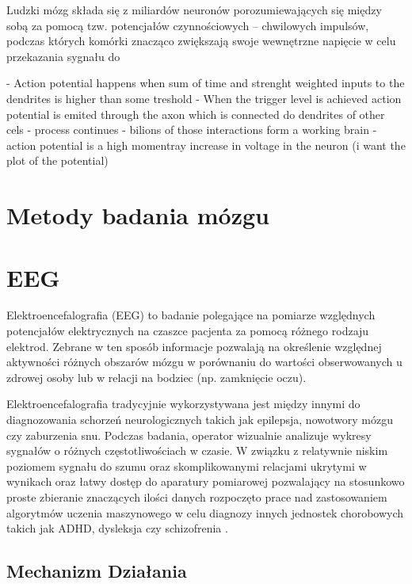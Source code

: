 \documentclass{./assets/wfis}
\begin{document}
Ludzki mózg składa się z miliardów neuronów porozumiewających się między sobą za pomocą tzw. potencjałów czynnościowych – chwilowych impulsów, podczas których komórki znacząco zwiększają swoje wewnętrzne napięcie w celu przekazania sygnału do

- Action potential happens when sum of time and strenght weighted inputs to the dendrites is higher than some treshold
- When the trigger level is achieved action potential is emited through the axon which is connected do dendrites of other cels - process continues
- bilions of those interactions form a working brain
- action potential is a high momentray increase in voltage in the neuron (i want the plot of the potential)

\section{Metody badania mózgu}



\section{EEG}
Elektroencefalografia (EEG) to badanie polegające na pomiarze względnych potencjałów elektrycznych na czaszce pacjenta za pomocą różnego rodzaju elektrod. Zebrane w ten sposób informacje pozwalają na określenie względnej aktywności różnych obszarów mózgu w porównaniu do wartości obserwowanych u zdrowej osoby lub w relacji na bodziec (np. zamknięcie oczu).

Elektroencefalografia tradycyjnie wykorzystywana jest między innymi do diagnozowania schorzeń neurologicznych takich jak epilepsja, nowotwory mózgu czy zaburzenia snu. Podczas badania, operator wizualnie analizuje wykresy sygnałów o różnych częstotliwościach w czasie. W związku z relatywnie niskim poziomem sygnału do szumu oraz skomplikowanymi relacjami ukrytymi w wynikach oraz łatwy dostęp do aparatury pomiarowej pozwalający na stosunkowo proste zbieranie znaczących ilości danych rozpoczęto prace nad zastosowaniem algorytmów uczenia maszynowego w celu diagnozy innych jednostek chorobowych takich jak ADHD, dysleksja czy schizofrenia \cite{ahire_comprehensive_2022, joshi_review_2021, clarke_eeg_2002}.

\subsection{Mechanizm Działania}
\end{document}
